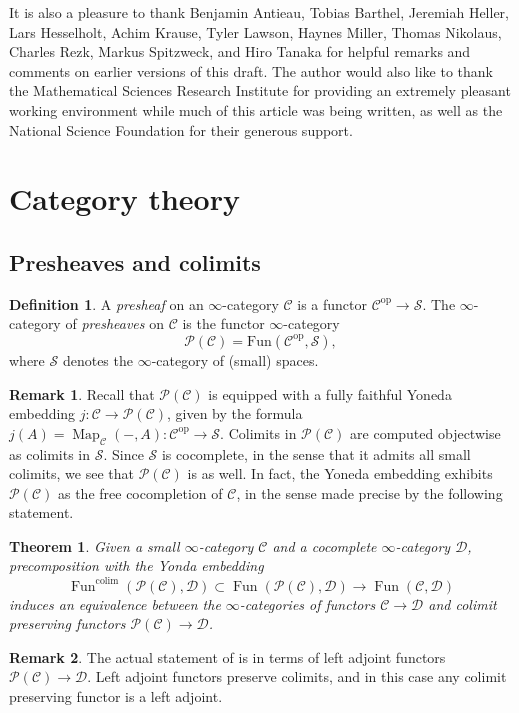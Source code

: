 \documentclass{article}
\newtheorem{theorem}{Theorem}[subsection]
\theoremstyle{definition}
\newtheorem{definition}{Definition}[subsection]
\newtheorem{remark}{Remark}[subsection]
\newcommand{\C}{\mathcal{C}}
\newcommand{\D}{\mathcal{D}}
\renewcommand{\P}{\mathcal{P}}
\renewcommand{\S}{\mathcal{S}}
\renewcommand{\i}{\infty}
\newcommand{\too}{\longrightarrow}
\newcommand{\op}{\mathrm{op}}
\DeclareMathOperator{\Fun}{Fun}
\DeclareMathOperator{\Map}{Map}
\begin{document}
It is also a pleasure to thank Benjamin Antieau, Tobias Barthel, Jeremiah Heller, Lars Hesselholt, Achim Krause, Tyler Lawson, Haynes Miller, Thomas Nikolaus, Charles Rezk, Markus Spitzweck, and Hiro Tanaka for helpful remarks and comments on earlier versions of this draft.
The author would also like to thank the Mathematical Sciences Research Institute for providing an extremely pleasant working environment while much of this article was being written, as well as the National Science Foundation for their generous support.

\section{Category theory}\label{sec:ct}



\subsection{Presheaves and colimits}


\begin{definition}
A {\em presheaf} on an $\i$-category $\C$ is a functor $\C^{\op}\to\S$.
The ${\infty}$-category of {\em presheaves} on $\C$ is the functor $\i$-category
\index{$\P$}
\[
\P(\mathcal{C}) = \mathrm{Fun}(\mathcal{C}^{\op}, \mathcal{S}),
\]
where  ${\mathcal{S}}$ denotes the ${\infty}$-category of (small) spaces.
\end{definition}
\begin{remark}
Recall \cite[Proposition 5.1.3.1]{HTT} that $\P(\C)$ is equipped with a fully faithful Yoneda embedding $j:\C\to\P(\C)$,
given by the formula $j(A)=\Map_{\C}(-,A):\C^{\op}\to\S$.
Colimits in $\P(\C)$ are computed objectwise as colimits in $\S$.
Since $\S$ is cocomplete, in the sense that it admits all small colimits, we see that $\P(\C)$ is as well.
In fact, the Yoneda embedding exhibits $\P(\C)$ as the free cocompletion of $\C$, in the sense made precise by the following statement.
\end{remark}
\begin{theorem}{\em \cite[Theorem 5.1.5.6]{HTT}}
Given a small $\infty$-category $\C$ and a cocomplete ${\infty}$-category $\D$, precomposition with the Yonda embedding
\[
\Fun^\mathrm{colim}(\P(\C),\D)\subset\Fun(\P(\C),\D)\too\Fun(\C,\D)
\]
induces an equivalence between the $\infty$-categories of functors $\C\to\D$ and colimit preserving functors $\P(\C)\to\D$.
\end{theorem}
\begin{remark}
The actual statement of \cite[Theorem 5.1.5.6]{HTT} is in terms of left adjoint functors $\P(\C)\to\D$.
Left adjoint functors preserve colimits, and in this case any colimit preserving functor is a left adjoint.
\end{remark}
\end{document}
